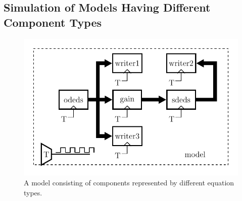 \documentclass{juliacon}
\begin{document}
\subsection{Simulation of Models Having Different Component Types}
\begin{figure}
    \centering
    \includegraphics[width=\linewidth]{figures/CoupledChuaModel/coupled_chua_model.pdf}
    \caption{A model consisting of components represented by different equation types.}
    \label{fig: coupled model}
\end{figure}
\end{document}
